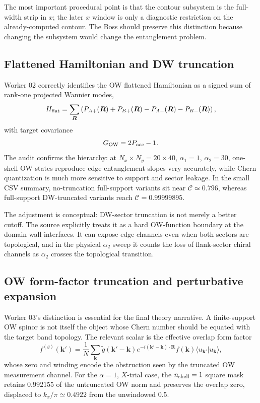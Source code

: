 \documentclass[aps,prb,onecolumn,nofootinbib,superscriptaddress]{revtex4-2}
\newcommand{\Id}{\mathbf{1}}
\newcommand{\Chern}{\mathcal{C}}
\newcommand{\GO}{G_{\rm OW}}
\newcommand{\Hflat}{H_{\rm flat}}
\begin{document}
The most important procedural point is that the contour subsystem is the full-width strip in $x$; the later $x$ window is only a diagnostic restriction on the already-computed contour.  The Boss should preserve this distinction because changing the subsystem would change the entanglement problem.

\subsection{Flattened Hamiltonian and DW truncation}

Worker 02 correctly identifies the OW flattened Hamiltonian as a signed sum of rank-one projected Wannier modes,
\begin{equation}
\Hflat=
\sum_{\bm R}\left(P_{A+}(\bm R)+P_{B+}(\bm R)
-P_{A-}(\bm R)-P_{B-}(\bm R)\right),
\end{equation}
with target covariance
\begin{equation}
\GO=2P_{\rm occ}-\Id .
\end{equation}
The audit confirms the hierarchy: at $N_x\times N_y=20\times 40$, $\alpha_1=1$, $\alpha_2=30$, one-shell OW states reproduce edge entanglement slopes very accurately, while Chern quantization is much more sensitive to support and sector leakage.  In the small CSV summary, no-truncation full-support variants sit near $\Chern\simeq0.796$, whereas full-support DW-truncated variants reach $\Chern=0.99999895$.

The adjustment is conceptual: DW-sector truncation is not merely a better cutoff.  The source explicitly treats it as a hard OW-function boundary at the domain-wall interfaces.  It can expose edge channels even when both sectors are topological, and in the physical $\alpha_2$ sweep it counts the loss of flank-sector chiral channels as $\alpha_2$ crosses the topological transition.

\subsection{OW form-factor truncation and perturbative expansion}

Worker 03's distinction is essential for the final theory narrative.  A finite-support OW spinor is not itself the object whose Chern number should be equated with the target band topology.  The relevant scalar is the effective overlap form factor
\begin{equation}
f^{(g)}(\bm{k}') =
\frac{1}{N}\sum_{\bm{k}}
\tilde g(\bm{k}'-\bm{k})e^{-i(\bm{k}'-\bm{k})\cdot\bm R}
f(\bm{k})\langle u_{\bm{k}'}|u_{\bm{k}}\rangle ,
\end{equation}
whose zero and winding encode the obstruction seen by the truncated OW measurement channel.  For the $\alpha=1$, $X$-trial case, the $n_{\rm shell}=1$ square mask retains $0.992155$ of the untruncated OW norm and preserves the overlap zero, displaced to $k_x/\pi\simeq0.4922$ from the unwindowed $0.5$.
\end{document}
